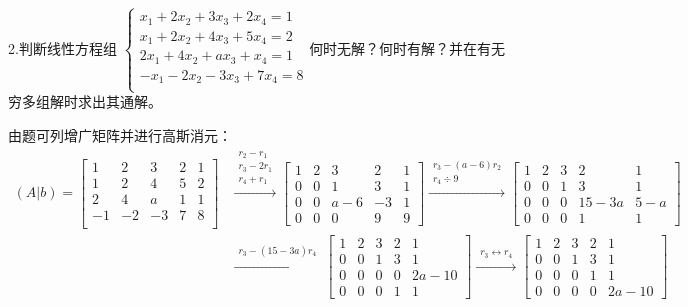 \documentclass{article}
\begin{document}
2.判断线性方程组
$
\begin{cases}
x_1+2x_2+3x_3+2x_4=1\\
x_1+2x_2+4x_3+5x_4=2\\
2x_1+4x_2+ax_3+x_4=1\\
-x_1-2x_2-3x_3+7x_4=8\\
\end{cases}
$何时无解？何时有解？并在有无穷多组解时求出其通解。

\begin{jie}
由题可列增广矩阵并进行高斯消元：
\begin{align*}
(A|b)=
\begin{bmatrix}
1 & 2 & 3 & 2 &1 \\
1 & 2 & 4 & 5 &2 \\
2 & 4 & a & 1 &1 \\
-1 & -2 & -3 & 7 &8 \\
\end{bmatrix}&
\xrightarrow{\substack{ r_2-r_1\\ r_3-2r_1 \\ r_4+r_1}}
{
\begin{bmatrix}
1 & 2 & 3 & 2 &1 \\
0 & 0 & 1 & 3 &1 \\
0 & 0 & a-6 & -3 &1 \\
0 & 0 & 0& 9 &9
\end{bmatrix}
}\xrightarrow{\substack{ r_3-(a-6)r_2 \\ r_4\div 9}}
{
\begin{bmatrix}
1 & 2 & 3 & 2 &1 \\
0 & 0 & 1 & 3 &1 \\
0 & 0& 0 & 15-3a & 5-a \\
0 & 0 & 0& 1 &1
\end{bmatrix}
}\\
&
\xrightarrow{\substack{ r_3-(15-3a)r_4}}
{
\begin{bmatrix}
1 & 2 & 3 & 2 &1 \\
0 & 0 & 1 & 3 &1 \\
0 & 0& 0 & 0 & 2a-10 \\
0 & 0 & 0& 1 &1
\end{bmatrix}
}\xrightarrow{\substack{ r_3\leftrightarrow r_4}}
{
\begin{bmatrix}
1 & 2 & 3 & 2 &1 \\
0 & 0 & 1 & 3 &1 \\
 0 & 0 & 0& 1 &1\\
0 & 0& 0 & 0 & 2a-10
\end{bmatrix}
}
\end{align*}


\end{jie}
\end{document}
